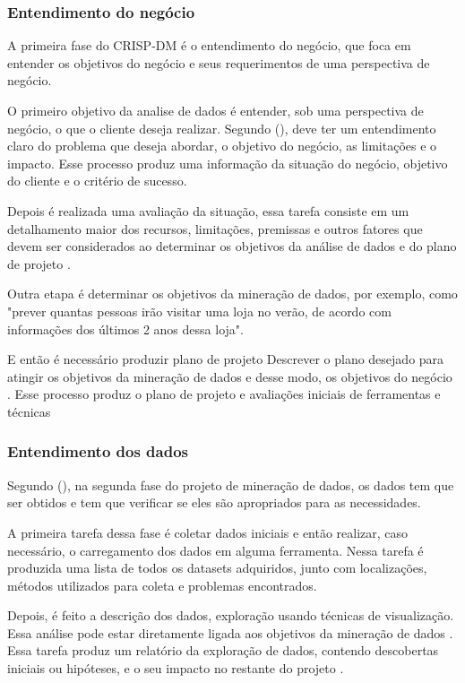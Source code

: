 \subsubsection{Entendimento do negócio}
A primeira fase do CRISP-DM é o entendimento do negócio, que foca em entender os objetivos do negócio e seus requerimentos de uma perspectiva de negócio.

O primeiro objetivo da analise de dados é entender, sob uma perspectiva de negócio, o que o cliente deseja realizar. Segundo \citeauthor{dmfd} (\citeyear{dmfd}), deve ter um entendimento claro do problema que deseja abordar, o objetivo do negócio, as limitações e o impacto. Esse processo produz uma informação da situação do negócio, objetivo do cliente e o critério de sucesso.

Depois é realizada uma avaliação da situação, essa tarefa consiste em um detalhamento maior dos recursos, limitações, premissas e outros fatores que devem ser considerados ao determinar os objetivos da análise de dados e do plano de projeto \citep[p. 14]{crispmanual}.

Outra etapa é determinar os objetivos da mineração de dados, por exemplo, como "prever quantas pessoas irão visitar uma loja no verão, de acordo com informações dos últimos 2 anos dessa loja".

E então é necessário produzir plano de projeto Descrever o plano desejado para atingir os objetivos da mineração de dados e desse modo, os objetivos do negócio \citep{crispmanual}. Esse processo produz o plano de projeto e avaliações iniciais de ferramentas e técnicas

\subsubsection{Entendimento dos dados}
Segundo \citeauthor{dmfd} (\citeyear{dmfd}), na segunda fase do projeto de mineração de dados, os dados tem que ser obtidos e tem que verificar se eles são apropriados para as necessidades.

A primeira tarefa dessa fase é coletar dados iniciais e então realizar, caso necessário, o carregamento dos dados em alguma ferramenta. Nessa tarefa é produzida uma lista de todos os datasets adquiridos, junto com localizações, métodos utilizados para coleta e problemas encontrados.

Depois, é feito a descrição dos dados, exploração usando técnicas de visualização. Essa análise pode estar diretamente ligada aos objetivos da mineração de dados \citep{crispmanual}. Essa tarefa produz um relatório da exploração de dados, contendo descobertas iniciais ou hipóteses, e o seu impacto no restante do projeto \citep{crispmanual}.

